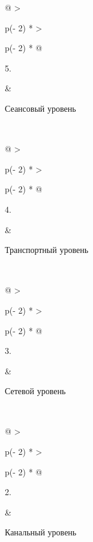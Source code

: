 \begin{longtable}[]{@{}
  >{\raggedright\arraybackslash}p{(\columnwidth - 2\tabcolsep) * }
  >{\raggedright\arraybackslash}p{(\columnwidth - 2\tabcolsep) * }@{}}
\toprule\noalign{}
\begin{minipage}[b]{\linewidth}\raggedright
5.
\end{minipage} & \begin{minipage}[b]{\linewidth}\raggedright
Сеансовый уровень
\end{minipage} \\
\midrule\noalign{}
\endhead
\bottomrule\noalign{}
\endlastfoot
\end{longtable}

\begin{longtable}[]{@{}
  >{\raggedright\arraybackslash}p{(\columnwidth - 2\tabcolsep) * }
  >{\raggedright\arraybackslash}p{(\columnwidth - 2\tabcolsep) * }@{}}
\toprule\noalign{}
\begin{minipage}[b]{\linewidth}\raggedright
4.
\end{minipage} & \begin{minipage}[b]{\linewidth}\raggedright
Транспортный уровень
\end{minipage} \\
\midrule\noalign{}
\endhead
\bottomrule\noalign{}
\endlastfoot
\end{longtable}

\begin{longtable}[]{@{}
  >{\raggedright\arraybackslash}p{(\columnwidth - 2\tabcolsep) * }
  >{\raggedright\arraybackslash}p{(\columnwidth - 2\tabcolsep) * }@{}}
\toprule\noalign{}
\begin{minipage}[b]{\linewidth}\raggedright
3.
\end{minipage} & \begin{minipage}[b]{\linewidth}\raggedright
Сетевой уровень
\end{minipage} \\
\midrule\noalign{}
\endhead
\bottomrule\noalign{}
\endlastfoot
\end{longtable}

\begin{longtable}[]{@{}
  >{\raggedright\arraybackslash}p{(\columnwidth - 2\tabcolsep) * }
  >{\raggedright\arraybackslash}p{(\columnwidth - 2\tabcolsep) * }@{}}
\toprule\noalign{}
\begin{minipage}[b]{\linewidth}\raggedright
2.
\end{minipage} & \begin{minipage}[b]{\linewidth}\raggedright
Канальный уровень
\end{minipage} \\
\midrule\noalign{}
\endhead
\bottomrule\noalign{}
\endlastfoot
\end{longtable}


